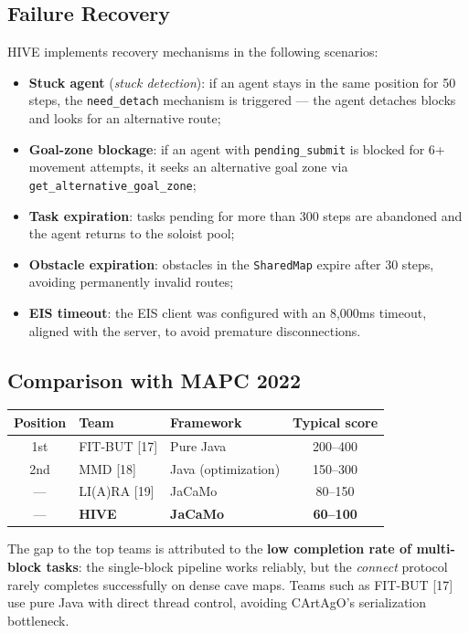 \documentclass[11pt,a4paper]{article}
\newcommand{\code}[1]{\texttt{#1}}
\begin{document}
\subsection{Failure Recovery}
HIVE implements recovery mechanisms in the following scenarios:
\begin{itemize}
  \item \textbf{Stuck agent} (\emph{stuck detection}): if an agent stays in the same position for 50 steps, the \code{need\_detach} mechanism is triggered --- the agent detaches blocks and looks for an alternative route;
  \item \textbf{Goal-zone blockage}: if an agent with \code{pending\_submit} is blocked for 6+ movement attempts, it seeks an alternative goal zone via \code{get\_alternative\_goal\_zone};
  \item \textbf{Task expiration}: tasks pending for more than 300 steps are abandoned and the agent returns to the soloist pool;
  \item \textbf{Obstacle expiration}: obstacles in the \code{SharedMap} expire after 30 steps, avoiding permanently invalid routes;
  \item \textbf{EIS timeout}: the EIS client was configured with an 8{,}000ms timeout, aligned with the server, to avoid premature disconnections.
\end{itemize}

\subsection{Comparison with MAPC 2022}
\begin{table}[H]
\centering
\begin{tabularx}{\linewidth}{c X l c}
\toprule
\textbf{Position} & \textbf{Team} & \textbf{Framework} & \textbf{Typical score} \\
\midrule
1st & FIT-BUT [17] & Pure Java & 200--400 \\
2nd & MMD [18] & Java (optimization) & 150--300 \\
--- & LI(A)RA [19] & JaCaMo & 80--150 \\
--- & \textbf{HIVE} & \textbf{JaCaMo} & \textbf{60--100} \\
\bottomrule
\end{tabularx}
\end{table}

The gap to the top teams is attributed to the \textbf{low completion rate of multi-block tasks}: the single-block pipeline works reliably, but the \emph{connect} protocol rarely completes successfully on dense cave maps. Teams such as FIT-BUT [17] use pure Java with direct thread control, avoiding CArtAgO's serialization bottleneck.
\end{document}
